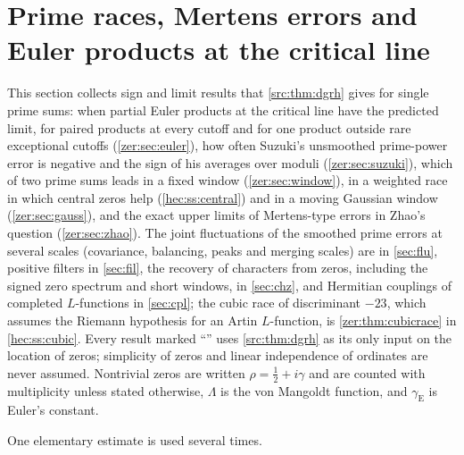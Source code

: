 \providecommand{\hecsgn}{\operatorname{sgn}}
\providecommand{\hecVar}{\operatorname{Var}}
\providecommand{\hecCov}{\operatorname{Cov}}
\providecommand{\hecE}{\mathbb{E}}
\providecommand{\hecind}{\mathbf{1}}
\section{Prime races, Mertens errors and Euler products at the critical line}\label{sec:zer}
\providecommand{\zerJ}{\mathcal{J}}
\providecommand{\zerK}{\mathcal{K}}
\providecommand{\zersinc}{\operatorname{sinc}}
\providecommand{\zergE}{\gamma_{\mathrm{E}}}
\providecommand{\zerLL}{\mathcal{L}}
\providecommand{\zerconv}{\operatorname{conv}}
\providecommand{\zerdiag}{\operatorname{diag}}
\providecommand{\zerSym}{\mathfrak{D}}
\providecommand{\zerLog}{\operatorname{Log}}

This section collects sign and limit results that \cref{src:thm:dgrh} gives for single prime sums:
when partial Euler products at the critical line have the predicted limit, for paired products at
every cutoff and for one product outside rare exceptional cutoffs (\cref{zer:sec:euler}), how often
Suzuki's unsmoothed prime-power error is negative and the sign of his averages over moduli
(\cref{zer:sec:suzuki}), which of two prime sums leads in a fixed window
(\cref{zer:sec:window}), in a weighted race in which central zeros help (\cref{hec:ss:central}) and in a
moving Gaussian window (\cref{zer:sec:gauss}), and the exact upper limits of Mertens-type errors in
Zhao's question (\cref{zer:sec:zhao}). The joint fluctuations of the smoothed prime errors at several
scales (covariance, balancing, peaks and merging scales) are in \cref{sec:flu}, positive filters in
\cref{sec:fil}, the recovery of characters from zeros, including the signed zero spectrum and short
windows, in \cref{sec:chz}, and Hermitian couplings of completed $L$-functions in \cref{sec:cpl}; the
cubic race of discriminant $-23$, which assumes the Riemann hypothesis for an Artin $L$-function, is
\cref{zer:thm:cubicrace} in \cref{hec:ss:cubic}. Every result marked ``\stG'' uses
\cref{src:thm:dgrh} as its only input on the location of zeros; simplicity of zeros and linear
independence of ordinates are never assumed. Nontrivial zeros are written
$\rho=\tfrac12+i\gamma$ and are counted with multiplicity unless stated otherwise, $\Lambda$ is
the von Mangoldt function, and $\zergE$ is Euler's constant.

One elementary estimate is used several times.

